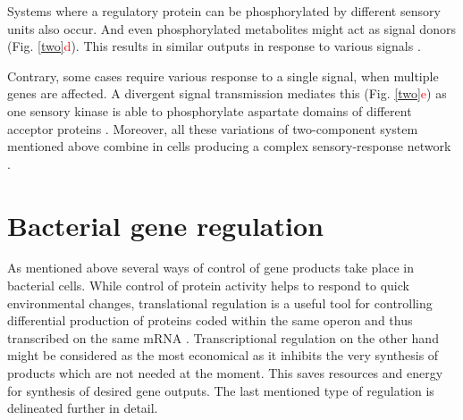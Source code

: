 Systems where a regulatory protein can be phosphorylated by different sensory units also occur.
And even phosphorylated metabolites might act as signal donors (Fig. \ref{two}\textcolor{red}{d}).
This results in similar outputs in response to various signals \cite{kaczmarczyk2014complex, chambonnier2016hybrid}.

Contrary, some cases require various response to a single signal, when multiple genes are affected.
A divergent signal transmission mediates this (Fig. \ref{two}\textcolor{red}{e}) as one sensory kinase is able to phosphorylate aspartate domains of different acceptor proteins \cite{mika2005two, groisman2016feedback}.
Moreover, all these variations of two-component system mentioned above combine in cells producing a complex sensory-response network \cite{kaczmarczyk2014complex, chambonnier2016hybrid}.



\section{Bacterial gene regulation}
As mentioned above several ways of control of gene products take place in bacterial cells.
While control of protein activity helps to respond to quick environmental changes, translational regulation is a useful tool for controlling differential production of proteins coded within the same operon and thus transcribed on the same mRNA \cite{dar2018extensive}.
Transcriptional regulation on the other hand might be considered as the most economical as it inhibits the very synthesis of products which are not needed at the moment.
This saves resources and energy for synthesis of desired gene outputs.
The last mentioned type of regulation is delineated further in detail.


